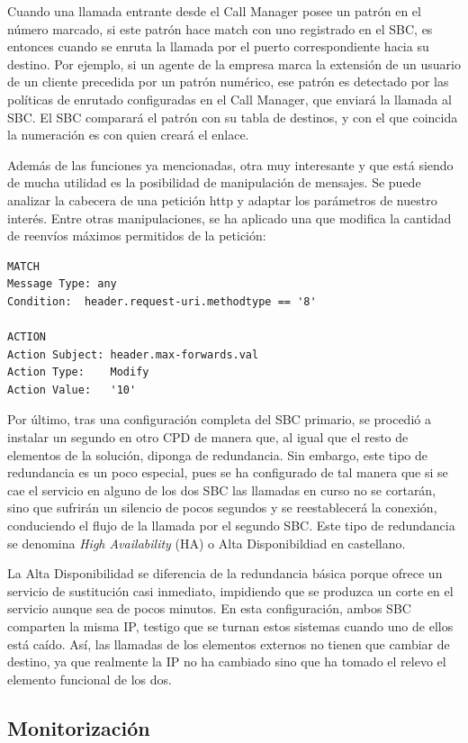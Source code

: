 \documentclass[a4paper, 12pt]{book}
\begin{document}
Cuando una llamada entrante desde el Call Manager posee un patrón en el número marcado, si este patrón hace match con uno registrado en el SBC, es entonces cuando se enruta la llamada por el puerto correspondiente hacia su destino.
Por ejemplo, si un agente de la empresa marca la extensión de un usuario de un cliente precedida por un patrón numérico, ese patrón es detectado por las políticas de enrutado configuradas en el Call Manager, que enviará la llamada al SBC. El SBC comparará el patrón con su tabla de destinos, y con el que coincida la numeración es con quien creará el enlace.

Además de las funciones ya mencionadas, otra muy interesante y que está siendo de mucha utilidad es la posibilidad de manipulación de mensajes. Se puede analizar la cabecera de una petición http y adaptar los parámetros de nuestro interés. Entre otras manipulaciones, se ha aplicado una que modifica la cantidad de reenvíos máximos permitidos de la petición:

\begin{verbatim}
MATCH
Message Type: any		
Condition:	header.request-uri.methodtype == '8'

ACTION
Action Subject:	header.max-forwards.val	
Action Type:	Modify	
Action Value:	'10'
\end{verbatim}

Por último, tras una configuración completa del SBC primario, se procedió a instalar un segundo en otro CPD de manera que, al igual que el resto de elementos de la solución, diponga de redundancia. Sin embargo, este tipo de redundancia es un poco especial, pues se ha configurado de tal manera que si se cae el servicio en alguno de los dos SBC las llamadas en curso no se cortarán, sino que sufrirán un silencio de pocos segundos y se reestablecerá la conexión, conduciendo el flujo de la llamada por el segundo SBC. Este tipo de redundancia se denomina \emph{High Availability} (HA) o Alta Disponibildiad en castellano.

La Alta Disponibilidad se diferencia de la redundancia básica porque ofrece un servicio de sustitución casi inmediato, impidiendo que se produzca un corte en el servicio aunque sea de pocos minutos. En esta configuración, ambos SBC comparten la misma IP, testigo que se turnan estos sistemas cuando uno de ellos está caído. Así, las llamadas de los elementos externos no tienen que cambiar de destino, ya que realmente la IP no ha cambiado sino que ha tomado el relevo el elemento funcional de los dos.

\subsection{Monitorización}
\label{sec:monitoring}
\end{document}

